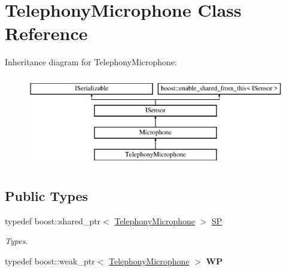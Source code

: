 \hypertarget{class_telephony_microphone}{}\section{Telephony\+Microphone Class Reference}
\label{class_telephony_microphone}
Inheritance diagram for Telephony\+Microphone\+:\begin{figure}[H]
\begin{center}
\leavevmode
\includegraphics[height=4.000000cm]{class_telephony_microphone}
\end{center}
\end{figure}
\subsection*{Public Types}
\begin{DoxyCompactItemize}
\item 
\mbox{\label{class_telephony_microphone_a81d4e21e9cc2904aa8811bd92f06f4da}} 
typedef boost\+::shared\+\_\+ptr$<$ \hyperlink{class_telephony_microphone}{Telephony\+Microphone} $>$ \hyperlink{class_telephony_microphone_a81d4e21e9cc2904aa8811bd92f06f4da}{SP}
\begin{DoxyCompactList}\small\item\em Types. \end{DoxyCompactList}\item 
\mbox{\label{class_telephony_microphone_aa619cd0158efa2fb353f770b8ab1bfa5}} 
typedef boost\+::weak\+\_\+ptr$<$ \hyperlink{class_telephony_microphone}{Telephony\+Microphone} $>$ {\bfseries WP}
\end{DoxyCompactItemize}
